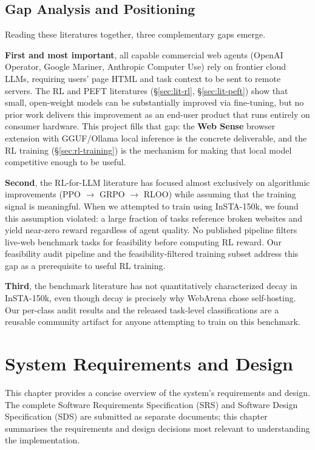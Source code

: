 \documentclass[12pt,a4paper]{report}
\begin{document}
\section{Gap Analysis and Positioning}\label{sec:lit-gap}

Reading these literatures together, three complementary gaps emerge.

\textbf{First and most important}, all capable commercial web agents (OpenAI Operator, Google Mariner, Anthropic Computer Use) rely on frontier cloud LLMs, requiring users' page HTML and task context to be sent to remote servers. The RL and PEFT literatures (\S\ref{sec:lit-rl}, \S\ref{sec:lit-peft}) show that small, open-weight models can be substantially improved via fine-tuning, but no prior work delivers this improvement as an end-user product that runs entirely on consumer hardware. This project fills that gap: the \textbf{Web Sense} browser extension with GGUF/Ollama local inference is the concrete deliverable, and the RL training (\S\ref{sec:rl-training}) is the mechanism for making that local model competitive enough to be useful.

\textbf{Second}, the RL-for-LLM literature has focused almost exclusively on algorithmic improvements (PPO $\to$ GRPO $\to$ RLOO) while assuming that the training signal is meaningful. When we attempted to train using InSTA-150k, we found this assumption violated: a large fraction of tasks reference broken websites and yield near-zero reward regardless of agent quality. No published pipeline filters live-web benchmark tasks for feasibility before computing RL reward. Our feasibility audit pipeline and the feasibility-filtered training subset address this gap as a prerequisite to useful RL training.

\textbf{Third}, the benchmark literature has not quantitatively characterized decay in InSTA-150k, even though decay is precisely why WebArena chose self-hosting. Our per-class audit results and the released task-level classifications are a reusable community artifact for anyone attempting to train on this benchmark.

\chapter{System Requirements and Design}\label{chap:design}

This chapter provides a concise overview of the system's requirements and design. The complete Software Requirements Specification (SRS) and Software Design Specification (SDS) are submitted as separate documents; this chapter summarises the requirements and design decisions most relevant to understanding the implementation.
\end{document}
